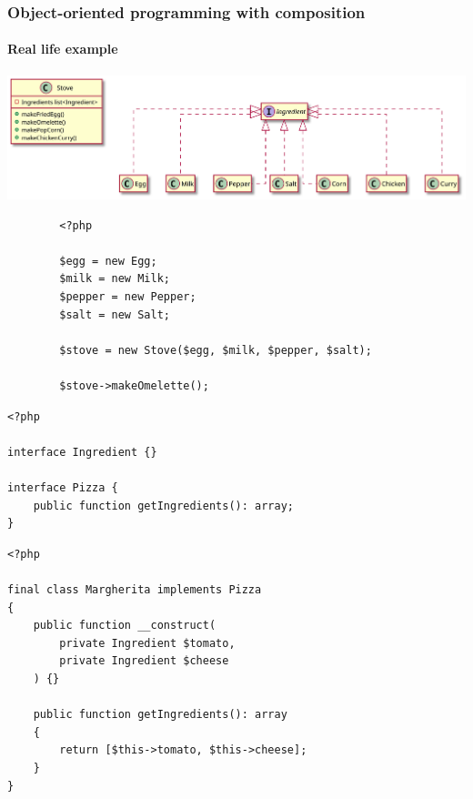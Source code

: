 \begin{frame}
    \frametitle{Object-oriented programming with composition}
    \framesubtitle{Real life example}

    \begin{center}
        \includegraphics[width=\textwidth]{src/session--composition-and-inheritance/resources/Composition-Stove.png}
    \end{center}
\end{frame}

\begin{frame}[fragile,c]
    \begin{lstlisting}
        <?php

        $egg = new Egg;
        $milk = new Milk;
        $pepper = new Pepper;
        $salt = new Salt;

        $stove = new Stove($egg, $milk, $pepper, $salt);

        $stove->makeOmelette();
        \end{lstlisting}
\end{frame}

\begin{frame}[fragile,c]
    \begin{lstlisting}
<?php

interface Ingredient {}

interface Pizza {
    public function getIngredients(): array;
}
    \end{lstlisting}
\end{frame}

\begin{frame}[fragile,c]
    \begin{lstlisting}
<?php

final class Margherita implements Pizza
{
    public function __construct(
        private Ingredient $tomato,
        private Ingredient $cheese
    ) {}

    public function getIngredients(): array
    {
        return [$this->tomato, $this->cheese];
    }
}
    \end{lstlisting}
\end{frame}

